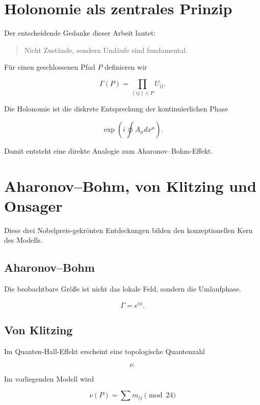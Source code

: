 \documentclass[11pt,a4paper]{article}
\begin{document}
	\section{Holonomie als zentrales Prinzip}
	
	Der entscheidende Gedanke dieser Arbeit lautet:
	
	\begin{quote}
		Nicht Zustände,
		sondern Umläufe sind fundamental.
	\end{quote}
	
	Für einen geschlossenen Pfad $P$
	definieren wir
	
	\[
	\Gamma(P)
	=
	\prod_{(ij)\in P}
	U_{ij}.
	\]
	
	Die Holonomie ist die diskrete Entsprechung
	der kontinuierlichen Phase
	
	\[
	\exp\left(
	i\oint A_\mu dx^\mu
	\right).
	\]
	
	Damit entsteht eine direkte Analogie
	zum Aharonov--Bohm-Effekt.
	
	\section{Aharonov--Bohm, von Klitzing und Onsager}
	
	Diese drei Nobelpreis-gekrönten Entdeckungen
	bilden den konzeptionellen Kern des Modells.
	
	\subsection{Aharonov--Bohm}
	
	Die beobachtbare Größe ist nicht das lokale Feld,
	sondern die Umlaufphase.
	
	\[
	\Gamma
	=
	e^{i\phi}.
	\]
	
	\subsection{Von Klitzing}
	
	Im Quanten-Hall-Effekt erscheint eine
	topologische Quantenzahl
	
	\[
	\nu.
	\]
	
	Im vorliegenden Modell wird
	
	\[
	\nu(P)
	=
	\sum m_{ij}
	\pmod{24}
	\]
	
\end{document}

